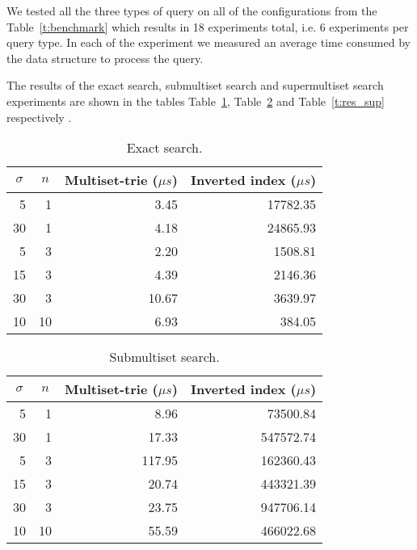 We tested all the three types of query on all of the configurations from the Table~\ref{t:benchmark} which 
results in 18 experiments total, i.e. 6 experiments per query type. In each of the experiment we measured an 
average time consumed by the data structure to process the query. 

The results of the exact search, submultiset search and supermultiset search experiments are shown in the tables 
Table~\ref{t:res_ex}, Table~\ref{t:res_sub} and Table~\ref{t:res_sup} respectively .

\begin{table}[h]
\center
\begin{tabular}{|r|r|r|r|}
\hline
\multicolumn{1}{|c|}{$\sigma$} & 
\multicolumn{1}{c|}{$n$} & 
\multicolumn{1}{c|}{Multiset-trie ($\mu s$)} & 
\multicolumn{1}{c|}{Inverted index ($\mu s$)} \\
\hline
5		& 1 & 3.45 & 17782.35\\
\hline
30	& 1 & 4.18 & 24865.93\\
\hline
5		& 3 & 2.20 & 1508.81\\
\hline
15	& 3 & 4.39 & 2146.36\\
\hline
30	& 3 & 10.67 & 3639.97\\
\hline
10	& 10 & 6.93 & 384.05\\
\hline
\end{tabular}
\caption{Exact search.}
\label{t:res_ex}
\end{table}

\begin{table}[h]
\center
\begin{tabular}{|r|r|r|r|}
\hline
\multicolumn{1}{|c|}{$\sigma$} & 
\multicolumn{1}{c|}{$n$} & 
\multicolumn{1}{c|}{Multiset-trie ($\mu s$)} & 
\multicolumn{1}{c|}{Inverted index ($\mu s$)} \\
\hline
5		& 1			& 8.96 & 73500.84\\
\hline
30	& 1			& 17.33 & 547572.74\\
\hline
5		& 3			& 117.95 & 162360.43\\
\hline
15	& 3			& 20.74 & 443321.39\\
\hline
30	& 3 		& 23.75 & 947706.14\\
\hline
10	& 10		& 55.59 & 466022.68\\
\hline
\end{tabular}
\caption{Submultiset search.}
\label{t:res_sub}
\end{table}

